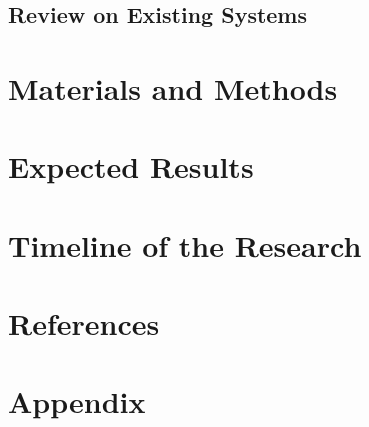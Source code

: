 \documentclass{article}
\begin{document}
\subsection{Review on Existing Systems}


\section{Materials and Methods}

\section{Expected Results}


\section{Timeline of the Research}


\section{References}
\printbibliography

\section{Appendix}

\end{document}
